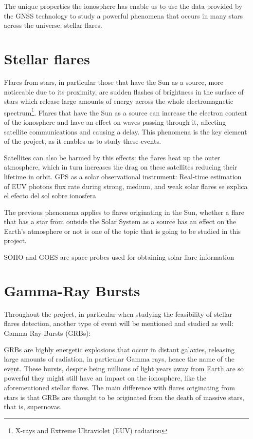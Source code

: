 The unique properties the ionosphere has enable us to use the data provided by the GNSS technology to study a powerful phenomena that occurs in many stars across the universe: stellar flares.

\section{Stellar flares}

Flares from stars, in particular those that have the Sun as a source, more noticeable due to its proximity, are sudden flashes of brightness in the surface of stars which release large amounts of energy across the whole electromagnetic spectrum\footnote{X-rays and Extreme Ultraviolet (EUV) radiation}.
Flares that have the Sun as a source can increase the electron content of the ionosphere and have an effect on waves passing through it, affecting satellite communications and causing a delay. This phenomena is the key element of the project, as it enables us to study these events.

Satellites can also be harmed by this effects: the flares heat up the outer atmosphere, which in turn increases the drag on these satellites reducing their lifetime in orbit.
{GPS as a solar observational instrument: Real-time estimation of EUV photons flux rate during strong, medium, and weak solar flares se explica el efecto del sol sobre ionosfera}

The previous phenomena applies to flares originating in the Sun, whether a flare that has a star from outside the Solar System as a source has an effect on the Earth’s atmosphere or not is one of the topic that is going to be studied in this project.

SOHO and GOES are space probes used for obtaining solar flare information \cite{hernandez2012gnss}

\section{Gamma-Ray Bursts}

Throughout the project, in particular when studying the feasibility of stellar flares detection, another type of event will be mentioned and studied as well: Gamma-Ray Bursts (GRBs):

GRBs are highly energetic explosions that occur in distant galaxies, releasing large amounts of radiation, in particular Gamma rays, hence the name of the event. These bursts, despite being millions of light years away from Earth are so powerful they might still have an impact on the ionosphere, like the aforementioned stellar flares. 
The main difference with flares originating from stars is that GRBs are thought to be originated from the death of massive stars, that is, supernovas.

